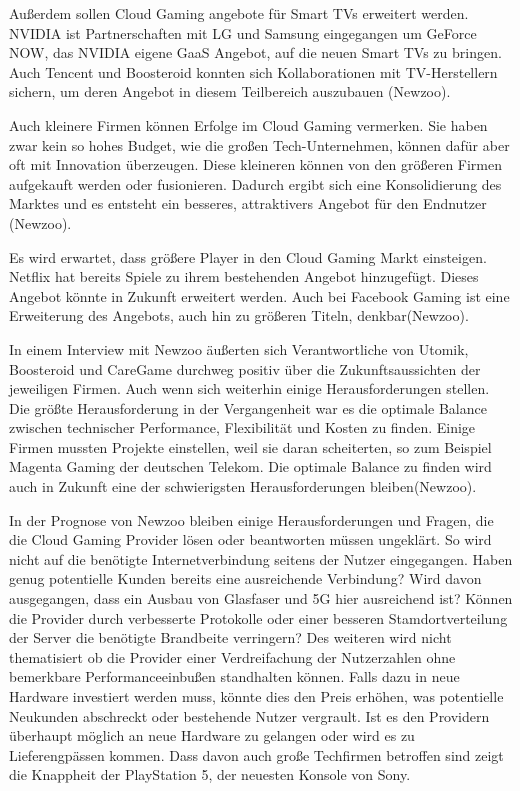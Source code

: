 \documentclass[12pt,toc=bib,toc=listof]{scrreprt}
\begin{document}
Außerdem sollen Cloud Gaming angebote für Smart TVs erweitert werden. NVIDIA ist Partnerschaften mit LG und Samsung eingegangen 
um GeForce NOW, das NVIDIA eigene GaaS Angebot, auf die neuen Smart TVs zu bringen. Auch Tencent und Boosteroid konnten sich 
Kollaborationen mit TV-Herstellern sichern, um deren Angebot in diesem Teilbereich auszubauen (Newzoo).

Auch kleinere Firmen können Erfolge im Cloud Gaming vermerken. Sie haben zwar kein so hohes Budget, wie die großen Tech-Unternehmen,
können dafür aber oft mit Innovation überzeugen. Diese kleineren können von den größeren Firmen aufgekauft werden oder fusionieren.
Dadurch ergibt sich eine Konsolidierung des Marktes und es entsteht ein besseres, attraktivers Angebot für den Endnutzer (Newzoo).

Es wird erwartet, dass größere Player in den Cloud Gaming Markt einsteigen. Netflix hat bereits Spiele zu ihrem bestehenden Angebot
hinzugefügt. Dieses Angebot könnte in Zukunft erweitert werden. Auch bei Facebook Gaming ist eine Erweiterung des Angebots, auch hin zu
größeren Titeln, denkbar(Newzoo).

In einem Interview mit Newzoo äußerten sich Verantwortliche von Utomik, Boosteroid und CareGame durchweg positiv über die Zukunftsaussichten
der jeweiligen Firmen. Auch wenn sich weiterhin einige Herausforderungen stellen. Die größte Herausforderung in der Vergangenheit war es 
die optimale Balance zwischen technischer Performance, Flexibilität und Kosten zu finden. Einige Firmen mussten Projekte einstellen, weil 
sie daran scheiterten, so zum Beispiel Magenta Gaming der deutschen Telekom. Die optimale Balance zu finden wird auch in Zukunft eine
der schwierigsten Herausforderungen bleiben(Newzoo). 

In der Prognose von Newzoo bleiben einige Herausforderungen und Fragen, die die Cloud Gaming Provider lösen 
oder beantworten müssen ungeklärt. So wird nicht auf die benötigte Internetverbindung seitens der Nutzer eingegangen.
Haben genug potentielle Kunden bereits eine ausreichende Verbindung? Wird davon ausgegangen, dass ein Ausbau von Glasfaser 
und 5G hier ausreichend ist? Können die Provider durch verbesserte Protokolle oder einer besseren Stamdortverteilung 
der Server die benötigte Brandbeite verringern? Des weiteren wird nicht thematisiert ob die Provider einer Verdreifachung 
der Nutzerzahlen ohne bemerkbare Performanceeinbußen standhalten können. Falls dazu in neue Hardware investiert werden muss, 
könnte dies den Preis erhöhen, was potentielle Neukunden abschreckt oder bestehende Nutzer vergrault. Ist es den Providern 
überhaupt möglich an neue Hardware zu gelangen oder wird es zu Lieferengpässen kommen. Dass davon auch große Techfirmen
betroffen sind zeigt die Knappheit der PlayStation 5, der neuesten Konsole von Sony.
\end{document}
